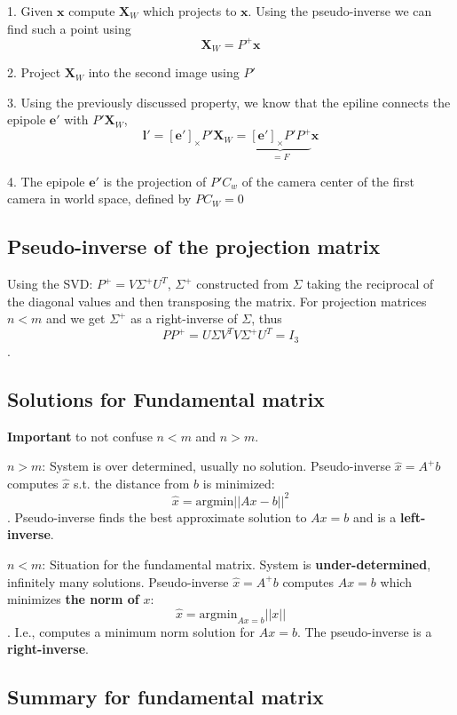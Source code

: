 1. Given $\mathbf{x}$ compute $\mathbf{X}_W$ which projects to $\mathbf{x}$. Using the pseudo-inverse we can find such a point using $$\mathbf{X}_W = P^+ \mathbf{x}$$

2. Project $\mathbf{X}_W$ into the second image using $P'$

3. Using the previously discussed property, we know that the epiline connects the epipole $\mathbf{e'}$ with $P'\mathbf{X}_W$, $$\mathbf{l'} = [\mathbf{e'}]_\times P' \mathbf{X}_W = \underset{=F}{\underbrace{[\mathbf{e'}]_\times P' P^+}} \mathbf{x}$$

4. The epipole $\mathbf{e'}$ is the projection of $P'C_w$ of the camera center of the first camera in world space, defined by $PC_W = 0$

\subsection{Pseudo-inverse of the projection matrix}

Using the SVD: $P^+ = V \Sigma^+ U^T$, $\Sigma^+$ constructed from $\Sigma$ taking the reciprocal of the diagonal values and then transposing the matrix. For projection matrices $n < m$ and we get $\Sigma^+$ as a right-inverse of $\Sigma$, thus $$PP^+ = U\Sigma V^T V\Sigma^+ U^T = I_3$$.

\subsection{Solutions for Fundamental matrix}

\textbf{Important} to not confuse $n<m$ and $n>m$.

$n>m$: System is over determined, usually no solution. Pseudo-inverse $\hat{x} = A^+ b$ computes $\hat{x}$ s.t. the distance from $b$ is minimized: $$\hat{x} = \mathrm{argmin} ||Ax - b||^2$$.
Pseudo-inverse finds the best approximate solution to $Ax = b$ and is a \textbf{left-inverse}.

$n<m$: Situation for the fundamental matrix. System is \textbf{under-determined}, infinitely many solutions. Pseudo-inverse $\hat{x} = A^+ b$ computes $Ax = b$ which minimizes \textbf{the norm of} $x$: $$\hat{x} = \mathrm{argmin}_{Ax = b} ||x||$$.
I.e., computes a minimum norm solution for $Ax = b$. The pseudo-inverse is a \textbf{right-inverse}.

\subsection{Summary for fundamental matrix}

